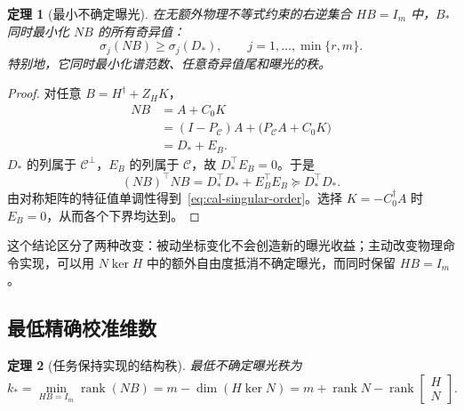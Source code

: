 \documentclass[11pt,a4paper]{article}
\numberwithin{equation}{section}
\newtheorem{theorem}{定理}[section]
\theoremstyle{definition}
\begin{document}
\begin{theorem}[最小不确定曝光]
\label{thm:cal-singular-opt}
在无额外物理不等式约束的右逆集合 $HB=I_m$ 中，$B_*$ 同时最小化 $NB$ 的所有奇异值：
\begin{equation}
  \sigma_j(NB)\ge\sigma_j(D_*),
  \qquad j=1,\ldots,\min\{r,m\}.
  \label{eq:cal-singular-order}
\end{equation}
特别地，它同时最小化谱范数、任意奇异值尾和曝光的秩。
\end{theorem}

\begin{proof}
对任意 $B=H^\dagger+Z_HK$，
\begin{align}
  NB
  &= A+C_0K\\
  &= (I-P_{\mathcal C})A+
     \big(P_{\mathcal C}A+C_0K\big)\\
  &=D_*+E_B .
\end{align}
$D_*$ 的列属于 $\mathcal C^\perp$，$E_B$ 的列属于 $\mathcal C$，故 $D_*^\top E_B=0$。于是
\begin{equation}
  (NB)^\top NB
  =D_*^\top D_*+E_B^\top E_B
  \succeq D_*^\top D_* .
\end{equation}
由对称矩阵的特征值单调性得到~\eqref{eq:cal-singular-order}。选择 $K=-C_0^\dagger A$ 时 $E_B=0$，从而各个下界均达到。
\end{proof}

这个结论区分了两种改变：被动坐标变化不会创造新的曝光收益；主动改变物理命令实现，可以用 $N\ker H$ 中的额外自由度抵消不确定曝光，而同时保留 $HB=I_m$。

\subsection{最低精确校准维数}

\begin{theorem}[任务保持实现的结构秩]
\label{thm:cal-rank}
最低不确定曝光秩为
\begin{equation}
  \boxed{
  k_*=
  \min_{HB=I_m}\operatorname{rank}(NB)
  =m-\dim(H\ker N)
  =m+\operatorname{rank}N-
  \operatorname{rank}
  \begin{bmatrix}H\\N\end{bmatrix}.}
  \label{eq:cal-kstar}
\end{equation}
\end{theorem}
\end{document}
